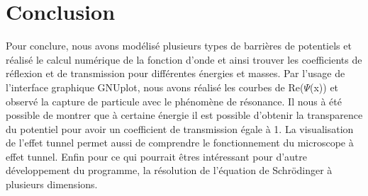 \section*{Conclusion}

\par Pour conclure, nous avons modélisé plusieurs types de barrières de potentiels et réalisé le calcul numérique de la fonction d'onde et ainsi trouver les coefficients de réflexion et de transmission pour différentes énergies et masses. Par l'usage de l'interface graphique GNUplot, nous avons réalisé les courbes de Re($\Psi$(x)) et observé la capture de particule avec le phénomène de résonance. Il nous à été possible de montrer que à certaine énergie il est possible d'obtenir la transparence du potentiel pour avoir un coefficient de transmission égale à 1. La visualisation de l'effet tunnel permet aussi de comprendre le fonctionnement du microscope à effet tunnel.
Enfin pour ce qui pourrait êtres intéressant pour d'autre développement du programme, la résolution de l'équation de Schrödinger à plusieurs dimensions.
